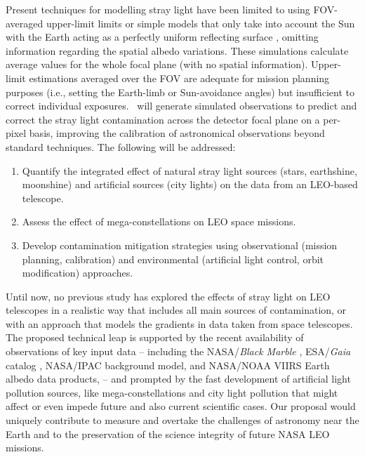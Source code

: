 \documentclass[usenames,dvipsnames,modern]{CLASS_FILES/aastex631}  %
\begin{document}
Present techniques for modelling stray light have been limited to using FOV-averaged upper-limit limits \citep{gasparvenancio+2016inproceedings_99040P} or simple models that only take into account the Sun with the Earth acting as a perfectly uniform reflecting surface \citep{kuntzer+2014inproceedings_91490W}, omitting information regarding the spatial albedo variations. These simulations calculate average values for the whole focal plane (with no spatial information). Upper-limit estimations averaged over the FOV are adequate for mission planning purposes (i.e., setting the Earth-limb or Sun-avoidance angles) but insufficient to correct individual exposures. \MyName\ will generate simulated observations to predict and correct the stray light contamination across the detector focal plane on a per-pixel basis, improving the calibration of astronomical observations beyond standard techniques. The following will be addressed:


\begin{enumerate}
    \item Quantify the integrated effect of natural stray light sources (stars, earthshine, moonshine) and artificial sources (city lights) on the data from an LEO-based telescope.
    
    \item Assess the effect of mega-constellations on LEO space missions.
    
    \item Develop contamination mitigation strategies using observational (mission planning, calibration) and environmental (artificial light control, orbit modification) approaches.
    
\end{enumerate}

Until now, no previous study has explored the effects of stray light on LEO telescopes in a realistic way that includes all main sources of contamination, or with an approach that models the gradients in data taken from space telescopes. The proposed technical leap is supported by the recent availability of observations of key input data -- including the NASA/\emph{Black Marble} \citep{roman+2018RSE210_113}, ESA/\emph{Gaia} catalog \citep{collaboration+2016aap595_2, collaboration+2018aap616_1}, NASA/IPAC background model, and NASA/NOAA VIIRS Earth albedo data products, \citep{liu+2017RSE201_256} -- and prompted by the fast development of artificial light pollution sources, like mega-constellations and city light pollution  \citep{falchi+2016an2_1600377, kocifaj+2021mnras504_40} that might affect or even impede future and also current scientific cases. Our proposal would uniquely contribute to measure and overtake the challenges of astronomy near the Earth and to the preservation of the science integrity of future NASA LEO missions. 
\end{document}
